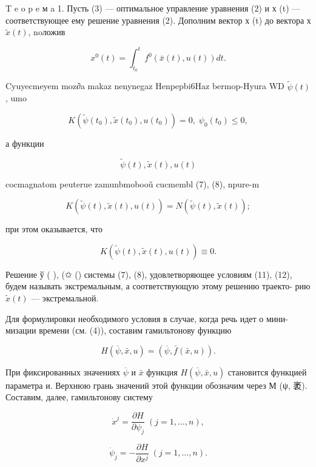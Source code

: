 \documentclass[10pt]{article}
\begin{document}
T e o p e м a 1. Пусть (3) — оптимальное управление уравнения (2) и х (t) — соответствующее ему решение уравнения (2). Дополним вектор х (t) до вектора х \(\widetilde{x}\left( t\right)\), noложив

\[
{x}^{0}\left( t\right)  = {\int }_{{t}_{0}}^{t}{f}^{0}\left( {\bar{x}\left( t\right),u\left( t\right) }\right) {dt}.
\]

Cyuyecmeyem moz∂a makaz nenynegaz Henpepbi6Haz bermop-Hyura WD \(\widetilde{\psi }\left( t\right)\), umo

\[
K\left( {\widetilde{\psi }\left( {t}_{0}\right),\widetilde{x}\left( {t}_{0}\right),u\left( {t}_{0}\right) }\right)  = 0,\;{\psi }_{0}\left( {t}_{0}\right)  \leq  0, \tag{10}
\]

а функции

\[
\widetilde{\psi }\left( t\right),\widetilde{x}\left( t\right),u\left( t\right)
\]

cocmagnatom peuterue zamunbmobooǔ cucmembl (7), (8), npure-m

\[
K\left( {\widetilde{\psi }\left( t\right),\widetilde{x}\left( t\right),u\left( t\right) }\right)  = N\left( {\widetilde{\psi }\left( t\right),\widetilde{x}\left( t\right) }\right) ; \tag{11}
\]

при этом оказывается, что

\[
K\left( {\widetilde{\psi }\left( t\right),\widetilde{x}\left( t\right),u\left( t\right) }\right)  \equiv  0. \tag{12}
\]

Решение ў ( ), (✩ () системы (7), (8), удовлетворяющее условиям (11), (12), будем называть экстремальным, а соответствующую этому решению траекто- рию \(\widetilde{x}\left( t\right)\) — экстремальной.

Для формулировки необходимого условия в случае, когда речь идет о мини- мизации времени (см. (4)), составим гамильтонову функцию

\[
H\left( {\overline{\psi },\bar{x},u}\right)  = \left( {\overline{\psi },\bar{f}\left( {\bar{x},u}\right) }\right).
\]

При фиксированных значениях \(\overline{\psi }\) и \(\bar{x}\) функция \(H\left( {\overline{\psi },\bar{x},u}\right)\) становится функцией параметра и. Верхнюю грань значений этой функции обозначим через М (ψ, 袤). Составим, далее, гамильтонову систему

\[
{\dot{x}}^{j} = \frac{\partial H}{\partial {\psi }_{j}}\;\left( {j = 1,\ldots,n}\right), \tag{13}
\]

\[
{\dot{\psi }}_{j} =  - \frac{\partial H}{\partial {x}^{j}}\;\left( {j = 1,\ldots,n}\right). \tag{14}
\]
\end{document}
